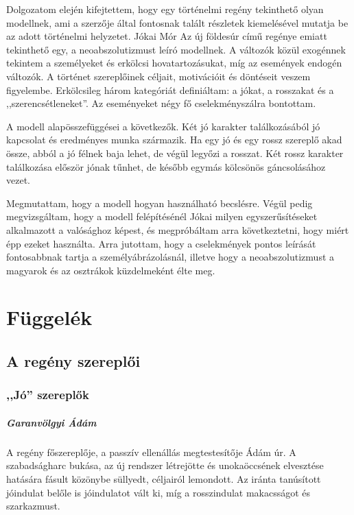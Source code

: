 \documentclass{thesis-ekf}
\begin{document}
    Dolgozatom elején kifejtettem, hogy egy történelmi regény tekinthető olyan modellnek, ami a szerzője által
        fontosnak talált részletek kiemelésével mutatja be az adott történelmi helyzetet.
    Jókai Mór Az új földesúr című regénye emiatt tekinthető egy, a neoabszolutizmust leíró modellnek.
    A változók közül exogénnek tekintem a személyeket és erkölcsi hovatartozásukat, míg az események endogén változók.
    A történet szereplőinek céljait, motivációit és döntéseit veszem figyelembe.
    Erkölcsileg három kategóriát definiáltam: a jókat, a rosszakat és a ,,szerencsétleneket''.
    Az eseményeket négy fő cselekményszálra bontottam.

    A modell alapösszefüggései a következők.
    Két jó karakter találkozásából jó kapcsolat és eredményes munka származik.
    Ha egy jó és egy rossz szereplő akad össze, abból a jó félnek baja lehet, de végül legyőzi a rosszat.
    Két rossz karakter találkozása először jónak tűnhet, de később egymás kölcsönös gáncsolásához vezet.

    Megmutattam, hogy a modell hogyan használható becslésre.
    Végül pedig megvizsgáltam, hogy a modell felépítésénél Jókai milyen egyszerűsítéseket alkalmazott a valósághoz képest,
        és megpróbáltam arra következtetni, hogy miért épp ezeket használta.
    Arra jutottam, hogy a cselekmények pontos leírását fontosabbnak tartja a személyábrázolásnál,
        illetve hogy a neoabszolutizmust a magyarok és az osztrákok küzdelmeként élte meg.

    \chapter{Függelék}

    \section{A regény szereplői}

    \subsection{,,Jó'' szereplők}

    \paragraph{Garanvölgyi Ádám}
    A regény főszereplője, a passzív ellenállás megtestesítője Ádám úr.
    A szabadságharc bukása, az új rendszer létrejötte és unokaöccsének elvesztése hatására fásult közönybe süllyedt,
        céljairól lemondott.
    Az iránta tanúsított jóindulat belőle is jóindulatot vált ki, míg a rosszindulat makacsságot és szarkazmust.
\end{document}
